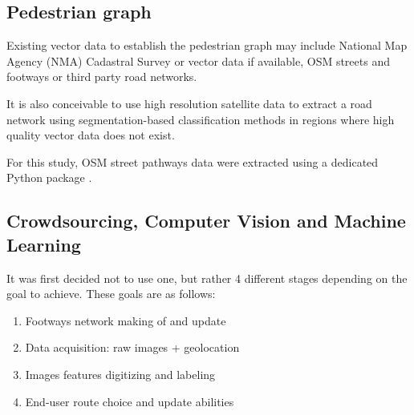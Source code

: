 \documentclass[10pt,conference,a4paper]{IEEEtran}
\begin{document}
\subsection{Pedestrian graph}
Existing vector data to establish the pedestrian graph may include National Map Agency (NMA) Cadastral Survey or vector data if available, OSM streets and footways or third party road networks.

It is also conceivable to use high resolution satellite %
data to extract a road network using segmentation-based classification methods
in regions where high quality vector data does not exist. 

For this study, OSM street pathways data were extracted using a dedicated Python package \cite{boeing_osmnx:_2017}.


\subsection{Crowdsourcing, Computer Vision and Machine Learning}
It was first decided not to use one, but rather 4 different stages depending on the goal to achieve. These goals are as follows:
\begin{enumerate}\setlength\itemsep{0.0em}
\item Footways network making of and update
\item Data acquisition: raw images + geolocation %
\item Images features digitizing and labeling %
\item End-user route choice and update abilities
\end{enumerate}
\end{document}
